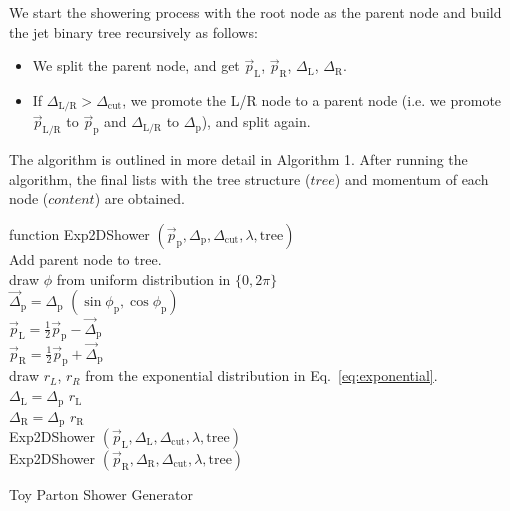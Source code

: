 \documentclass[12pt]{article}
\begin{document}
We start the showering process with the root node as the parent node and build the jet binary tree recursively as follows:
\begin{itemize}

\item We split the parent node, and get $\vec{p}_\text{L}$, $\vec{p}_\text{R}$, $\Delta_\text{L}$, $\Delta_\text{R}$.

\item If $\Delta_\text{L/R} > \Delta_\text{cut}$, we promote the L/R node to a parent node (i.e. we promote $\vec{p}_\text{L/R}$ to $\vec{p}_\text{p}$ and $\Delta_\text{L/R}$ to $\Delta_\text{p}$), and split again.

\end{itemize}

The algorithm is outlined in more detail in Algorithm 1. After running the algorithm, the final lists with the tree structure ($tree$) and momentum of each node ($content$) are obtained.

\begin{algorithm}

    function Exp2DShower $(\vec{p}_{\text{p}}, \Delta_\text{p}, \Delta_\text{cut}, \lambda, \text{tree})$\\
    \Indp
    Add parent node to tree. \\
      {
      	draw $\phi$ from uniform distribution in $\{0,2\pi\}$\\
	$\vec{\Delta}_\text{p}= \Delta_\text{p}\,\,(\sin\phi_\text{p},\cos\phi_\text{p})$\\
      	$\vec{p}_\text{L}= \frac{1}{2} \vec{p}_\text{p} - \vec{\Delta}_\text{p}$  \\
        $\vec{p}_\text{R}= \frac{1}{2} \vec{p}_\text{p} +\vec{\Delta}_\text{p}$\\
        draw $r_L$, $r_R$ from the exponential distribution in Eq.~\ref{eq:exponential}.\\
        $\Delta_\text{L} = \Delta_\text{p} \,\, r_\text{L}$\\
	$\Delta_\text{R} = \Delta_\text{p} \,\, r_\text{R}$\\
	Exp2DShower $(\vec{p}_{\text{L}}, \Delta_\text{L}, \Delta_\text{cut}, \lambda, \text{tree})$\\
	Exp2DShower $(\vec{p}_{\text{R}}, \Delta_\text{R}, \Delta_\text{cut}, \lambda, \text{tree})$\\
      }
    \caption{Toy Parton Shower Generator}
\end{algorithm}
\end{document}
